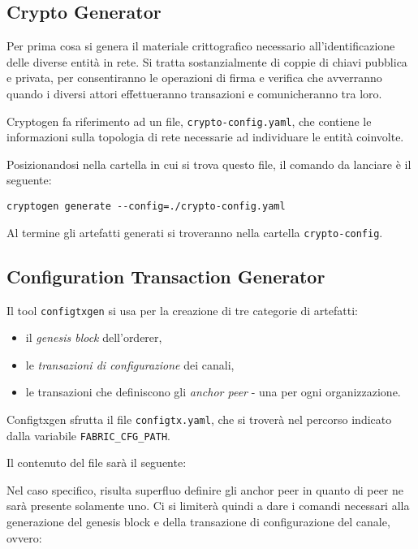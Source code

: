 	\subsection{Crypto Generator}
		Per prima cosa si genera il materiale crittografico necessario all'identificazione delle diverse entità in rete. Si tratta sostanzialmente di coppie di chiavi pubblica e privata, per consentiranno le operazioni di firma e verifica che avverranno quando i diversi attori effettueranno transazioni e comunicheranno tra loro.
		
		Cryptogen fa riferimento ad un file, \lstinline{crypto-config.yaml}, che contiene le informazioni sulla topologia di rete necessarie ad individuare le entità coinvolte.
		
		
		
		Posizionandosi nella cartella in cui si trova questo file, il comando da lanciare è il seguente:
\begin{lstlisting}
cryptogen generate --config=./crypto-config.yaml
\end{lstlisting}
		Al termine gli artefatti generati si troveranno nella cartella \lstinline{crypto-config}.
		
	\subsection{Configuration Transaction Generator}
		Il tool \lstinline{configtxgen} si usa per la creazione di tre categorie di artefatti: 
		\begin{itemize}
			\item il \emph{genesis block} dell'orderer,
			\item le \emph{transazioni di configurazione} dei canali,
			\item le transazioni che definiscono gli \emph{anchor peer} - una per ogni organizzazione.
		\end{itemize}
		 
		Configtxgen sfrutta il file \lstinline{configtx.yaml}, che si troverà nel percorso indicato dalla variabile \lstinline{FABRIC_CFG_PATH}.
		
		Il contenuto del file sarà il seguente:
		
		
		Nel caso specifico, risulta superfluo definire gli anchor peer in quanto di peer ne sarà presente solamente uno. Ci si limiterà quindi a dare i comandi necessari alla generazione del genesis block e della transazione di configurazione del canale, ovvero:
		
